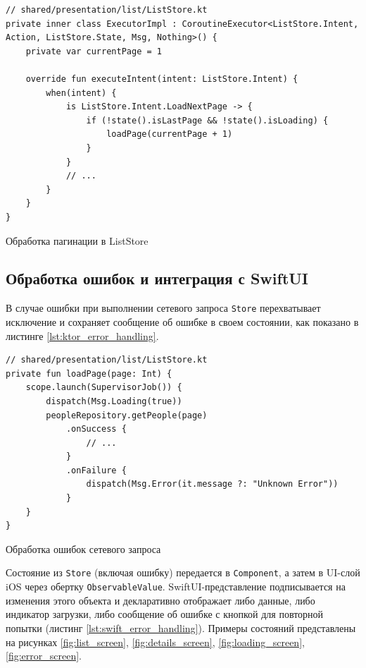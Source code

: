 \documentclass[14pt, russian]{scrartcl}
\begin{document}
\begin{listing}[H]
\begin{verbatim}
// shared/presentation/list/ListStore.kt
private inner class ExecutorImpl : CoroutineExecutor<ListStore.Intent, Action, ListStore.State, Msg, Nothing>() {
    private var currentPage = 1

    override fun executeIntent(intent: ListStore.Intent) {
        when(intent) {
            is ListStore.Intent.LoadNextPage -> {
                if (!state().isLastPage && !state().isLoading) {
                    loadPage(currentPage + 1)
                }
            }
            // ...
        }
    }
}
\end{verbatim}
\caption{Обработка пагинации в ListStore}
\label{lst:list_store_pagination}
\end{listing}

\subsection{Обработка ошибок и интеграция с SwiftUI}

В случае ошибки при выполнении сетевого запроса \texttt{Store} перехватывает исключение и сохраняет сообщение об ошибке в своем состоянии, как показано в листинге \ref{lst:ktor_error_handling}.

\begin{listing}[H]
\begin{verbatim}
// shared/presentation/list/ListStore.kt
private fun loadPage(page: Int) {
    scope.launch(SupervisorJob()) {
        dispatch(Msg.Loading(true))
        peopleRepository.getPeople(page)
            .onSuccess {
                // ...
            }
            .onFailure {
                dispatch(Msg.Error(it.message ?: "Unknown Error"))
            }
    }
}
\end{verbatim}
\caption{Обработка ошибок сетевого запроса}
\label{lst:ktor_error_handling}
\end{listing}

Состояние из \texttt{Store} (включая ошибку) передается в \texttt{Component}, а затем в UI-слой iOS через обертку \texttt{ObservableValue}. SwiftUI-представление подписывается на изменения этого объекта и декларативно отображает либо данные, либо индикатор загрузки, либо сообщение об ошибке с кнопкой для повторной попытки (листинг \ref{lst:swift_error_handling}). Примеры состояний представлены на рисунках \ref{fig:list_screen}, \ref{fig:details_screen}, \ref{fig:loading_screen}, \ref{fig:error_screen}.
\end{document}
